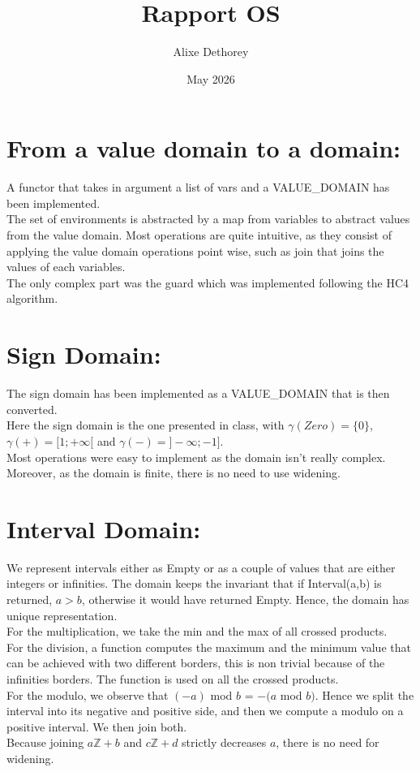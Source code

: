 \documentclass{article}
\title{Rapport OS}
\author{Alixe Dethorey}
\date{May 2026}
\begin{document}
\maketitle

\section{From a value domain to a domain:}
A functor that takes in argument a list of vars and a VALUE\_DOMAIN has been implemented.\\
The set of environments is abstracted by a map from variables to abstract values from the value domain. Most operations are quite intuitive, as they consist of applying the value domain operations point wise, such as join that joins the values of each variables. \\
The only complex part was the guard which was implemented following the HC4 algorithm.

\section{Sign Domain:}
The sign domain has been implemented as a VALUE\_DOMAIN that is then converted.\\
Here the sign domain is the one presented in class, with $\gamma(Zero)=\{0\}$, $\gamma(+) = [1;+\infty[$ and $\gamma(-) = ]-\infty;-1]$.\\
Most operations were easy to implement as the domain isn't really complex. Moreover, as the domain is finite, there is no need to use widening.

\section{Interval Domain:}
We represent intervals either as Empty or as a couple of values that are either integers or infinities. The domain keeps the invariant that if Interval(a,b) is returned, $a>b$, otherwise it would have returned Empty. Hence, the domain has unique representation.\\
For the multiplication, we take the min and the max of all crossed products.\\
For the division, a function computes the maximum and the minimum value that can be achieved with two different borders, this is non trivial because of the infinities borders. The function is used on all the crossed products.\\
For the modulo, we observe that $(-a)$ mod $b$ = $-(a$ mod $b)$. Hence we split the interval into its negative and positive side, and then we compute a modulo on a positive interval. We then join both.\\
Because joining $a\mathbb{Z} + b$ and $c\mathbb{Z} + d$ strictly decreases $a$, there is no need for widening.
\end{document}

